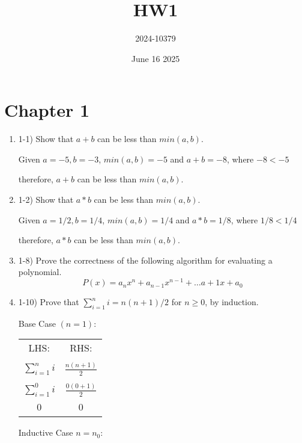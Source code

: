 \documentclass{article}
\title{HW1}
\author{2024-10379}
\date{June 16 2025}
\begin{document}
\maketitle

\section{Chapter 1}
\begin{enumerate}
    \item 1-1) Show that $a + b$ can be less than $min(a,b)$.
    
    Given $a = -5, b = -3$, $min(a,b) = -5$ and $a+b = -8$, where $-8 < -5$
    
    therefore, $a+b$ can be less than $min(a,b)$.
    
    \item 1-2) Show that $ a * b $ can be less than $min(a,b)$.
    
    Given $a = 1/2, b = 1/4$, $min(a,b) = 1/4$ and $a*b = 1/8$, where $1/8 < 1/4$
    
    therefore, $a*b$ can be less than $min(a,b)$.
    
    \item 1-8) Prove the correctness of the following algorithm for evaluating a polynomial.
    $$P(x) = a_nx^n + a_{n-1}x^{n-1} + \ldots a+1x + a_0$$
    \begin{center}
    \end{center}
    
    \item 1-10) Prove that $\sum_{i=1}^{n}i=n(n+1)/2 $ for $n \ge 0 $, by induction.
    
    Base Case $(n = 1)$:
    \begin{center}
        \begin{tabular}{ c | c } 
        LHS: & RHS: \\ & \\
        $ \sum_{i=1}^{n} i $ & $ \frac{n(n+1)}{2}$ \\ \\
        $ \sum_{i=1}^{0} i $ & $ \frac{0(0+1)}{2}$ \\ \\
        $ 0 $ & $ 0 $ \\ \\
        \end{tabular}
    \end{center}
    Inductive Case $ n = n_0 $:
    

\end{enumerate}
\end{document}
